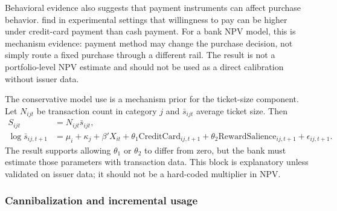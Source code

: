 \documentclass[11pt]{article}
\newcommand{\1}{\mathbf{1}}
\begin{document}
Behavioral evidence also suggests that payment instruments can affect purchase
behavior. \citet{prelec2001creditcard} find in experimental settings that
willingness to pay can be higher under credit-card payment than cash payment.
For a bank NPV model, this is mechanism evidence: payment method may change the
purchase decision, not simply route a fixed purchase through a different rail.
The result is not a portfolio-level NPV estimate and should not be used as a
direct calibration without issuer data.

The conservative model use is a mechanism prior for the ticket-size component.
Let $N_{ijt}$ be transaction count in category $j$ and $\bar{s}_{ijt}$ average
ticket size. Then
\begin{align}
  S_{ijt} &= N_{ijt}\bar{s}_{ijt}, \label{eq:spend-count-ticket}\\
  \log \bar{s}_{ij,t+1}
    &= \mu_i+\kappa_j+\beta'X_{it}
       +\theta_1 \mathrm{CreditCard}_{ij,t+1}
       +\theta_2 \mathrm{RewardSalience}_{ij,t+1}
       +\epsilon_{ij,t+1}.
       \label{eq:ticket-size-payment}
\end{align}
The \citet{prelec2001creditcard} result supports allowing
$\theta_1$ or $\theta_2$ to differ from zero, but the bank must estimate those
parameters with transaction data. This block is explanatory unless validated on
issuer data; it should not be a hard-coded multiplier in NPV.

\subsubsection{Cannibalization and incremental usage}
\end{document}
